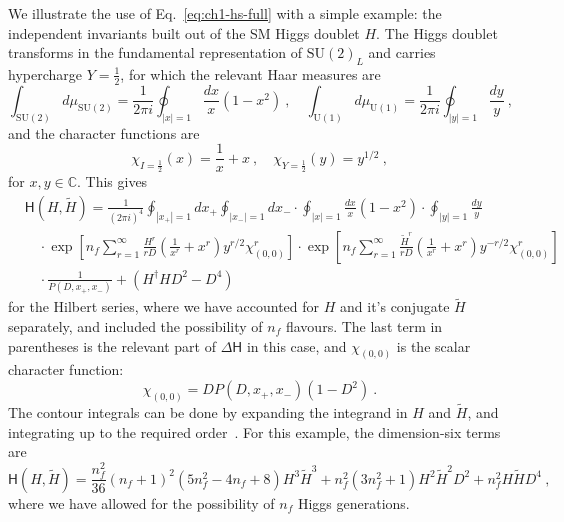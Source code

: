 We illustrate the use of Eq.~\eqref{eq:ch1-hs-full} with a simple example: the
independent invariants built out of the SM Higgs doublet $H$. The Higgs doublet
transforms in the fundamental representation of $\mathrm{SU}(2)_{L}$ and carries
hypercharge $Y=\tfrac{1}{2}$, for which the relevant Haar measures
are~\cite{Hanany:2008sb}
\begin{equation}
  \int_{\mathrm{SU}(2)} d\mu_{\mathrm{SU}(2)} = \frac{1}{2 \pi i} \oint_{|x|=1} \frac{dx}{x} (1 - x^{2}) \ , \quad \int_{\mathrm{U}(1)} d\mu_{\mathrm{U}(1)} = \frac{1}{2 \pi i} \oint_{|y|=1} \frac{dy}{y} \ ,
\end{equation}
and the character functions are~\cite{Lehman:2015via, Feger:2012bs}
\begin{equation}
  \chi_{I=\tfrac{1}{2}}(x) = \frac{1}{x} + x \ , \quad \chi_{Y=\tfrac{1}{2}}(y) = y^{1/2} \ ,
\end{equation}
for $x,y \in \mathbb{C}$. This gives~\cite{Henning:2017fpj}
\begin{equation}
  \begin{aligned}
    &\mathsf{H}(H, \tilde{H}) = \frac{1}{(2\pi i)^{4}}\oint_{|x_{+}|=1} dx_{+} \oint_{|x_{-}|=1} dx_{-} \cdot \oint_{|x|=1} \frac{dx}{x} (1-x^{2}) \cdot \oint_{|y|=1} \frac{dy}{y} \\
    &\quad \cdot \exp \left[ n_{f} \sum_{r=1}^{\infty} \frac{H^{r}}{r D} \left( \frac{1}{x^{r}} + x^{r} \right) y^{r/2} \chi^{r}_{(0,0)} \right] \cdot \exp \left[ n_{f} \sum_{r=1}^{\infty} \frac{\tilde{H}^{r}}{r D} \left( \frac{1}{x^{r}} + x^{r} \right) y^{-r/2} \chi^{r}_{(0,0)} \right] \\
    &\quad \cdot \frac{1}{P(D, x_{+}, x_{-})} + (H^{\dagger}H D^{2} - D^{4})
  \end{aligned}
\end{equation}
for the Hilbert series, where we have accounted for $H$ and it's conjugate
$\tilde{H}$ separately, and included the possibility of $n_{f}$ flavours. The
last term in parentheses is the relevant part of $\Delta \mathsf{H}$ in this
case, and $\chi_{(0,0)}$ is the scalar character function:
\begin{equation}
  \chi_{(0,0)} = D P(D, x_{+}, x_{-}) (1 - D^{2}) \ .
\end{equation}
The contour integrals can be done by expanding the integrand in $H$ and
$\tilde{H}$, and integrating up to the required order~\cite{Pouliot:1998yv}. For
this example, the dimension-six terms are
\begin{equation}
  \mathsf{H}(H, \tilde{H}) = \frac{n_{f}^{2}}{36} (n_{f} + 1)^{2} (5n_{f}^{2}-4n_{f}+8) H^{3}\tilde{H}^{3} + n_{f}^{2}(3n_{f}^{2}+1) H^{2}\tilde{H}^{2}D^{2} + n_{f}^{2} H \tilde{H} D^{4} \ ,
\end{equation}
where we have allowed for the possibility of $n_{f}$ Higgs generations.

